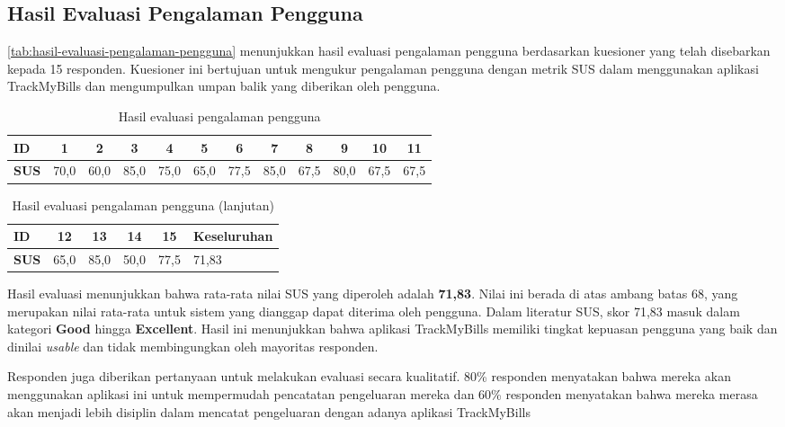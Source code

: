 \subsection{Hasil Evaluasi Pengalaman Pengguna}
\label{subsec:hasil-evaluasi-pengalaman-pengguna}

\autoref{tab:hasil-evaluasi-pengalaman-pengguna} menunjukkan hasil evaluasi pengalaman pengguna berdasarkan kuesioner yang telah disebarkan kepada 15 responden. Kuesioner ini bertujuan untuk mengukur pengalaman pengguna dengan metrik SUS dalam menggunakan aplikasi TrackMyBills dan mengumpulkan umpan balik yang diberikan oleh pengguna. 

\begin{table}[h!]
\centering
\caption{Hasil evaluasi pengalaman pengguna}
\label{tab:hasil-evaluasi-pengalaman-pengguna}
\begin{tabularx}{\linewidth}{|l|*{11}{c|}}
\hline
\textbf{ID} & 1 & 2 & 3 & 4 & 5 & 6 & 7 & 8 & 9 & 10 & 11 \\ \hline
\textbf{SUS} & 70,0 & 60,0 & 85,0 & 75,0 & 65,0 & 77,5 & 85,0 & 67,5 & 80,0 & 67,5 & 67,5 \\ \hline
\end{tabularx}
\end{table}

\begin{table}[h!]
    \ContinuedFloat
\centering
\caption{Hasil evaluasi pengalaman pengguna (lanjutan)}
\begin{tabularx}{\textwidth}{|l|*{4}{c|}X|}
\hline
\textbf{ID} & 12 & 13 & 14 & 15 & Keseluruhan \\ \hline
\textbf{SUS} & 65,0 & 85,0 & 50,0 & 77,5 & 71,83 \\ \hline
\end{tabularx}
\end{table}

Hasil evaluasi menunjukkan bahwa rata-rata nilai SUS yang diperoleh adalah \textbf{71,83}. Nilai ini berada di atas ambang batas 68, yang merupakan nilai rata-rata untuk sistem yang dianggap dapat diterima oleh pengguna. Dalam literatur SUS, skor 71,83 masuk dalam kategori \textbf{Good} hingga \textbf{Excellent}. Hasil ini menunjukkan bahwa aplikasi TrackMyBills memiliki tingkat kepuasan pengguna yang baik dan dinilai \emph{usable} dan tidak membingungkan oleh mayoritas responden. 

Responden juga diberikan pertanyaan untuk melakukan evaluasi secara kualitatif. 80\% responden menyatakan bahwa mereka akan menggunakan aplikasi ini untuk mempermudah pencatatan pengeluaran mereka dan 60\% responden menyatakan bahwa mereka merasa akan menjadi lebih disiplin dalam mencatat pengeluaran dengan adanya aplikasi TrackMyBills
